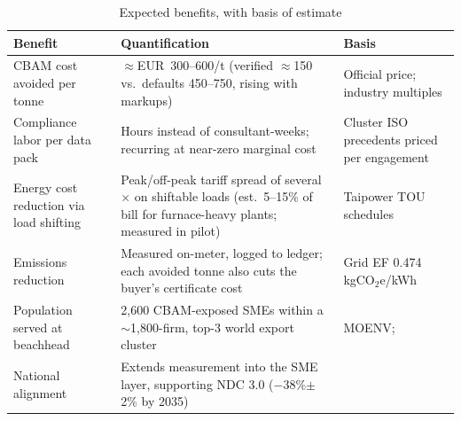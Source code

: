 \begin{table}[htbp]
\caption{Expected benefits, with basis of estimate}
\label{tab:benefits}
\small
\begin{tabularx}{\textwidth}{@{}p{}Xp{}@{}}
\toprule
\textbf{Benefit} & \textbf{Quantification} & \textbf{Basis} \\
\midrule
CBAM cost avoided per tonne & $\approx$EUR~300--600/t (verified $\approx$150 vs.\ defaults 450--750, rising with markups) & Official price\cite{ecprice}; industry multiples\cite{specialinsert} \\
Compliance labor per data pack & Hours instead of consultant-weeks; recurring at near-zero marginal cost & Cluster ISO precedents priced per engagement\cite{chanchin} \\
Energy cost reduction via load shifting & Peak/off-peak tariff spread of several$\times$ on shiftable loads (est.\ 5--15\% of bill for furnace-heavy plants; measured in pilot) & Taipower TOU schedules\cite{taipower} \\
Emissions reduction & Measured on-meter, logged to ledger; each avoided tonne also cuts the buyer's certificate cost & Grid EF 0.474 kgCO$_2$e/kWh\cite{moeaea} \\
Population served at beachhead & 2,600 CBAM-exposed SMEs within a $\sim$1,800-firm, top-3 world export cluster & MOENV\cite{tpt-cbam}; \cite{goebel,ktimes} \\
National alignment & Extends measurement into the SME layer, supporting NDC 3.0 ($-$38\%$\pm$2\% by 2035) & \cite{ndc} \\
\bottomrule
\end{tabularx}
\end{table}

